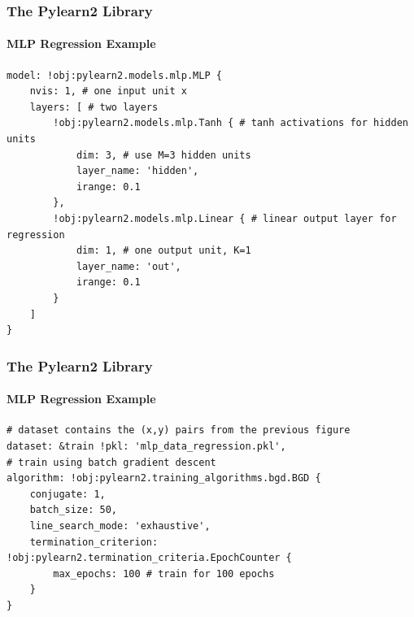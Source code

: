 \documentclass[xetex,professionalfont]{beamer}
\begin{document}

\begin{frame}[fragile]
\frametitle{The Pylearn2 Library}
\framesubtitle{MLP Regression Example}


\begin{verbatim}
model: !obj:pylearn2.models.mlp.MLP {
    nvis: 1, # one input unit x
    layers: [ # two layers
        !obj:pylearn2.models.mlp.Tanh { # tanh activations for hidden units
            dim: 3, # use M=3 hidden units
            layer_name: 'hidden',
            irange: 0.1
        },
        !obj:pylearn2.models.mlp.Linear { # linear output layer for regression
            dim: 1, # one output unit, K=1 
            layer_name: 'out',
            irange: 0.1
        }
    ]
}
\end{verbatim}

\end{frame}



\begin{frame}[fragile]
\frametitle{The Pylearn2 Library}
\framesubtitle{MLP Regression Example}

\begin{verbatim}
# dataset contains the (x,y) pairs from the previous figure
dataset: &train !pkl: 'mlp_data_regression.pkl',
# train using batch gradient descent
algorithm: !obj:pylearn2.training_algorithms.bgd.BGD {
    conjugate: 1,
    batch_size: 50,
    line_search_mode: 'exhaustive',
    termination_criterion: !obj:pylearn2.termination_criteria.EpochCounter {
        max_epochs: 100 # train for 100 epochs
    }
}
\end{verbatim}

\end{frame}

\end{document}
